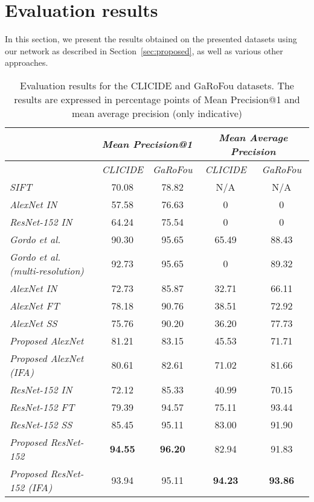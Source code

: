 \section{Evaluation results}\label{sec:evalresults}
In this section, we present the results obtained on the presented datasets
using our network as described in Section~\ref{sec:proposed}, as well
as various other approaches.

\begin{table}
\begin{tabular}{|l|c|c||c|c|}
\hline & \multicolumn{2}{c||}{\emph{Mean Precision@1}} &
\multicolumn{2}{c|}{\emph{Mean Average Precision}}\\
\hline & \emph{CLICIDE} & \emph{GaRoFou} & \emph{CLICIDE} & \emph{GaRoFou}\\
\hline \emph{SIFT} & 70.08 & 78.82 & N/A & N/A\\
\hline \emph{AlexNet IN} & 57.58 & 76.63 & 0 & 0\\
\hline \emph{ResNet-152 IN} & 64.24 & 75.54 & 0 & 0\\
\hline \emph{Gordo et al.~\cite{gordo_deep_2016}}
& 90.30 & 95.65 & 65.49 & 88.43\\
\hline \emph{Gordo et al.~\cite{gordo_deep_2016} (multi-resolution)}
& 92.73 & 95.65 & 0 & 89.32\\
\hline \emph{AlexNet IN} & 72.73 & 85.87 & 32.71 & 66.11\\
\hline \emph{AlexNet FT} & 78.18 & 90.76 & 38.51 & 72.92\\
\hline \emph{AlexNet SS} & 75.76 & 90.20 & 36.20 & 77.73\\
\hline \emph{Proposed AlexNet} & 81.21 & 83.15 & 45.53 & 71.71\\
\hline \emph{Proposed AlexNet (IFA)} & 80.61 & 82.61 & 71.02 & 81.66\\
\hline \emph{ResNet-152 IN} & 72.12 & 85.33 & 40.99 & 70.15\\
\hline \emph{ResNet-152 FT} & 79.39 & 94.57 & 75.11 & 93.44\\
\hline \emph{ResNet-152 SS} & 85.45 & 95.11 & 83.00 & 91.90\\
\hline \emph{Proposed ResNet-152} & \textbf{94.55} & \textbf{96.20}
& 82.94 & 91.83\\
\hline \emph{Proposed ResNet-152 (IFA)} & 93.94 & 95.11
& \textbf{94.23} & \textbf{93.86}\\
\hline
\end{tabular}
\caption{Evaluation results for the CLICIDE and GaRoFou datasets.
The results are expressed in percentage points of
Mean Precision@1 and mean average precision (only indicative)
\label{tab:results}}
\end{table}

